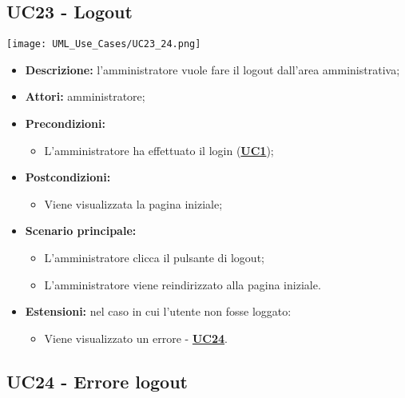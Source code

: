 \subsection{UC23 - Logout}
\label{sec:UC23}
\texttt{[image: UML\_Use\_Cases/UC23\_24.png]}
\begin{itemize}
	\item \textbf{Descrizione:} l'amministratore vuole fare il logout dall'area amministrativa; 
	\item \textbf{Attori:} amministratore;
	\item \textbf{Precondizioni:} 
	\begin{itemize}
		\item L’amministratore ha effettuato il login (\hyperref[sec:UC1]{\textbf{UC1}});
	\end{itemize}
	\item \textbf{Postcondizioni:} 
	\begin{itemize}
		\item Viene visualizzata la pagina iniziale;
	\end{itemize}
	\item \textbf{Scenario principale:} 
	\begin{itemize}
		\item L’amministratore clicca il pulsante di logout;
		\item L’amministratore viene reindirizzato alla pagina iniziale.
	\end{itemize}
	\item \textbf{Estensioni:} nel caso in cui l'utente non fosse loggato:
	\begin{itemize}
		\item Viene visualizzato un errore - \hyperref[sec:UC24]{\textbf{UC24}}.
	\end{itemize}
\end{itemize}

\subsection{UC24 - Errore logout}
\label{sec:UC24}

